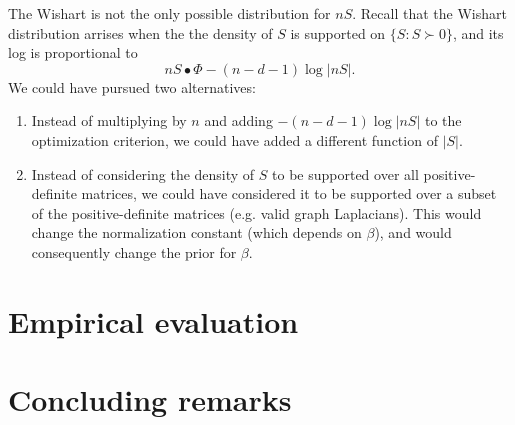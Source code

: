 \documentclass[12pt]{article}
\theoremstyle{plain}
\begin{document}
The Wishart is not the only possible distribution for $n S$.  Recall that the
Wishart distribution arrises when the the density of $S$ is supported on
$\{ S : S \succ 0 \}$, and its log is proportional to
\[
    n S \bullet \Phi
        - (n-d-1) \log |n S|.
\]
We could have pursued two alternatives:
\begin{enumerate}
    \item Instead of multiplying by $n$ and adding $-(n-d-1) \log |n S|$ to the
        optimization criterion, we could have added a different function of
        $|S|$.
    \item Instead of considering the density of $S$ to be supported over
        all positive-definite matrices, we could have considered it to be
        supported over a subset of the positive-definite matrices
        (e.g. valid graph Laplacians).  This would change the normalization
        constant (which depends on $\beta$), and would consequently change the
        prior for $\beta$.
\end{enumerate}

\section{Empirical evaluation}

\section{Concluding remarks}



\end{document}
